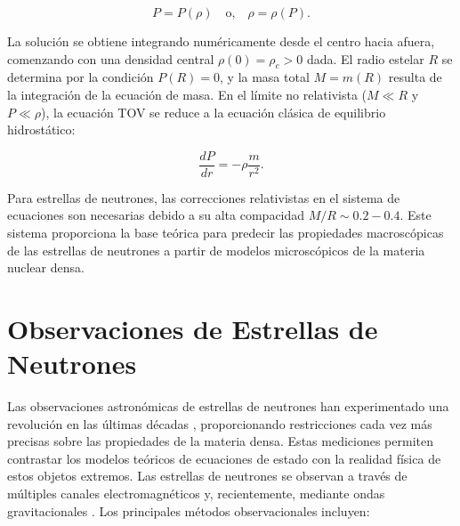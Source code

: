 \begin{equation}
	P = P(\rho) \quad \text{o,} \quad \rho = \rho(P).
	\label{eq:ecuacion_estado}
\end{equation}


La solución se obtiene integrando numéricamente desde el centro hacia afuera, comenzando con una densidad central $\rho(0) = \rho_c > 0$ dada. El radio estelar $R$ se determina por la condición $P(R) = 0$, y la masa total $M = m(R)$ resulta de la integración de la ecuación de masa. En el límite no relativista ($M \ll R$ y $P \ll \rho$), la ecuación TOV se reduce a la ecuación clásica de equilibrio hidrostático:

\begin{equation}
	\frac{dP}{dr} = -\rho \frac{m}{r^2}.
\end{equation}

Para estrellas de neutrones, las correcciones relativistas en el sistema de ecuaciones son necesarias debido a su alta compacidad $M/R \sim 0.2-0.4$. Este sistema proporciona la base teórica para predecir las propiedades macroscópicas de las estrellas de neutrones a partir de modelos microscópicos de la materia nuclear densa.

\section{Observaciones de Estrellas de Neutrones}

Las observaciones astronómicas de estrellas de neutrones han experimentado una revolución en las últimas décadas \cite{pianMergersBinaryNeutron2021}, proporcionando restricciones cada vez más precisas sobre las propiedades de la materia densa. Estas mediciones permiten contrastar los modelos teóricos de ecuaciones de estado con la realidad física de estos objetos extremos. Las estrellas de neutrones se observan a través de múltiples canales electromagnéticos \cite{glendenningCompactStarsNuclear2000} y, recientemente, mediante ondas gravitacionales \cite{fonsecaNANOGravNineyearData2016}. Los principales métodos observacionales incluyen:

